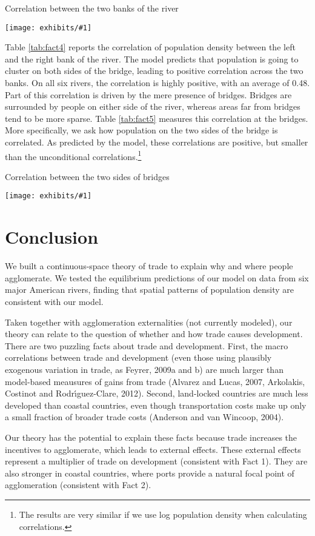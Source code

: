 \documentclass[12pt]{article}
\newcommand{\dotable}[2]{\begin{table}[h!]
  \caption{#2\label{tab:#1}}
\center %
\texttt{[image: exhibits/\#1]}
\end{table}}
\begin{document}
\dotable{fact4}{Correlation between the two banks of the river}

Table \ref{tab:fact4} reports the correlation of population density between
the left and the right bank of the river. The model predicts that population
is going to cluster on both sides of the bridge, leading to positive
correlation across the two banks. On all six rivers, the correlation is
highly positive, with an average of 0.48. Part of this correlation is driven
by the mere presence of bridges. Bridges are surrounded by people on either
side of the river, whereas areas far from bridges tend to be more sparse.
Table \ref{tab:fact5} measures this correlation at the bridges. More
specifically, we ask how population on the two sides of the bridge is
correlated. As predicted by the model, these correlations are positive, but
smaller than the unconditional correlations.\footnote{%
The results are very similar if we use log population density when
calculating correlations.}

\dotable{fact5}{Correlation between the two sides of bridges}

\section{Conclusion}

We built a continuous-space theory of trade to explain why and where people
agglomerate. We tested the equilibrium predictions of our model on data from
six major American rivers, finding that spatial patterns of population
density are consistent with our model.

Taken together with agglomeration externalities (not currently modeled), our
theory can relate to the question of whether and how trade causes
development. There are two puzzling facts about trade and development.
First, the macro correlations between trade and development (even those
using plausibly exogenous variation in trade, as Feyrer, 2009a and b) are
much larger than model-based meausures of gains from trade (Alvarez and
Lucas, 2007, Arkolakis, Costinot and Rodr\'{\i}guez-Clare, 2012). Second,
land-locked countries are much less developed than coastal countries, even
though transportation costs make up only a small fraction of broader trade
costs (Anderson and van Wincoop, 2004).

Our theory has the potential to explain these facts because trade increases
the incentives to agglomerate, which leads to external effects. These
external effects represent a multiplier of trade on development (consistent
with Fact 1). They are also stronger in coastal countries, where ports
provide a natural focal point of agglomeration (consistent with Fact 2).
\end{document}
